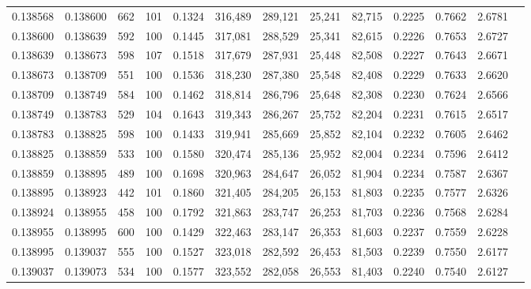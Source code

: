 \begin{tabular}{rrrrrrrrrrrrr}
0.138568 & 0.138600 &   662 & 101 &                                     0.1324 & 316,489 & 289,121 &  25,241 &  82,715 & 0.2225 & 0.7662 & 2.6781 \\
0.138600 & 0.138639 &   592 & 100 &                                     0.1445 & 317,081 & 288,529 &  25,341 &  82,615 & 0.2226 & 0.7653 & 2.6727 \\
0.138639 & 0.138673 &   598 & 107 &                                     0.1518 & 317,679 & 287,931 &  25,448 &  82,508 & 0.2227 & 0.7643 & 2.6671 \\
0.138673 & 0.138709 &   551 & 100 &                                     0.1536 & 318,230 & 287,380 &  25,548 &  82,408 & 0.2229 & 0.7633 & 2.6620 \\
0.138709 & 0.138749 &   584 & 100 &                                     0.1462 & 318,814 & 286,796 &  25,648 &  82,308 & 0.2230 & 0.7624 & 2.6566 \\
0.138749 & 0.138783 &   529 & 104 &                                     0.1643 & 319,343 & 286,267 &  25,752 &  82,204 & 0.2231 & 0.7615 & 2.6517 \\
0.138783 & 0.138825 &   598 & 100 &                                     0.1433 & 319,941 & 285,669 &  25,852 &  82,104 & 0.2232 & 0.7605 & 2.6462 \\
0.138825 & 0.138859 &   533 & 100 &                                     0.1580 & 320,474 & 285,136 &  25,952 &  82,004 & 0.2234 & 0.7596 & 2.6412 \\
0.138859 & 0.138895 &   489 & 100 &                                     0.1698 & 320,963 & 284,647 &  26,052 &  81,904 & 0.2234 & 0.7587 & 2.6367 \\
0.138895 & 0.138923 &   442 & 101 &                                     0.1860 & 321,405 & 284,205 &  26,153 &  81,803 & 0.2235 & 0.7577 & 2.6326 \\
0.138924 & 0.138955 &   458 & 100 &                                     0.1792 & 321,863 & 283,747 &  26,253 &  81,703 & 0.2236 & 0.7568 & 2.6284 \\
0.138955 & 0.138995 &   600 & 100 &                                     0.1429 & 322,463 & 283,147 &  26,353 &  81,603 & 0.2237 & 0.7559 & 2.6228 \\
0.138995 & 0.139037 &   555 & 100 &                                     0.1527 & 323,018 & 282,592 &  26,453 &  81,503 & 0.2239 & 0.7550 & 2.6177 \\
0.139037 & 0.139073 &   534 & 100 &                                     0.1577 & 323,552 & 282,058 &  26,553 &  81,403 & 0.2240 & 0.7540 & 2.6127 \\

\end{tabular}
